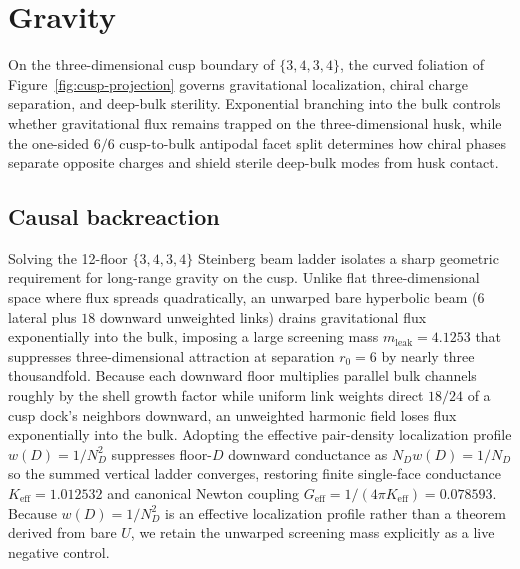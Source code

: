 \section{Gravity}
\label{sec:gravity}

On the three-dimensional cusp boundary of $\{3,4,3,4\}$, the curved foliation of Figure~\ref{fig:cusp-projection}
governs gravitational localization, chiral charge separation, and deep-bulk sterility. Exponential branching into the
bulk controls whether gravitational flux remains trapped on the three-dimensional husk, while the one-sided $6/6$
cusp-to-bulk antipodal facet split determines how chiral phases separate opposite charges and shield sterile deep-bulk
modes from husk contact.

\subsection{Causal backreaction}

Solving the 12-floor $\{3,4,3,4\}$ Steinberg beam ladder isolates a sharp geometric requirement for long-range gravity
on the cusp. Unlike flat three-dimensional space where flux spreads quadratically, an unwarped bare hyperbolic beam ($6$
lateral plus $18$ downward unweighted links) drains gravitational flux exponentially into the bulk, imposing a large
screening mass $m_{\mathrm{leak}} = 4.1253$ that suppresses three-dimensional attraction at separation $r_0 = 6$ by
nearly three thousandfold. Because each downward floor multiplies parallel bulk channels roughly by the shell growth
factor while uniform link weights direct $18/24$ of a cusp dock's neighbors downward, an unweighted harmonic field loses
flux exponentially into the bulk. Adopting the effective pair-density localization profile $w(D) = 1 / N_D^2$ suppresses
floor-$D$ downward conductance as $N_D w(D) = 1 / N_D$ so the summed vertical ladder converges, restoring finite
single-face conductance $K_{\mathrm{eff}} = 1.012532$ and canonical Newton coupling
$G_{\mathrm{eff}} = 1/(4\pi K_{\mathrm{eff}}) = 0.078593$. Because $w(D) = 1/N_D^2$ is an effective localization
profile rather than a theorem derived from bare $U$, we retain the unwarped screening mass explicitly as a live negative
control.

